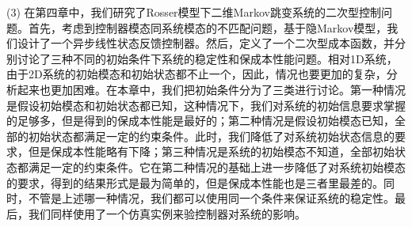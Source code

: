 	(3) 在第四章中，我们研究了Rosser模型下二维Markov跳变系统的二次型控制问题。首先，考虑到控制器模态同系统模态的不匹配问题，基于隐Markov模型，我们设计了一个异步线性状态反馈控制器。然后，定义了一个二次型成本函数，并分别讨论了三种不同的初始条件下系统的稳定性和保成本性能问题。相对1D系统，由于2D系统的初始模态和初始状态都不止一个，因此，情况也要更加的复杂，分析起来也更加困难。在本章中，我们把初始条件分为了三类进行讨论。第一种情况是假设初始模态和初始状态都已知，这种情况下，我们对系统的初始信息要求掌握的足够多，但是得到的保成本性能是最好的；第二种情况是假设初始模态已知，全部的初始状态都满足一定的约束条件。此时，我们降低了对系统初始状态信息的要求，但是保成本性能略有下降；第三种情况是系统的初始模态不知道，全部初始状态都满足一定的约束条件。它在第二种情况的基础上进一步降低了对系统初始模态的要求，得到的结果形式是最为简单的，但是保成本性能也是三者里最差的。同时，不管是上述哪一种情况，我们都可以使用同一个条件来保证系统的稳定性。最后，我们同样使用了一个仿真实例来验控制器对系统的影响。
	
	
	
	
	
	
